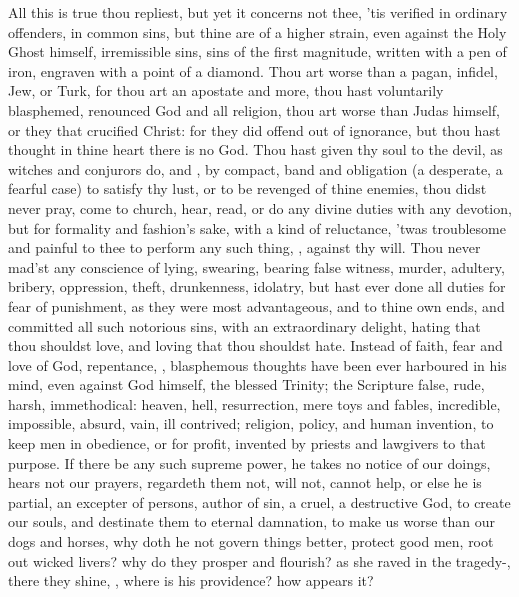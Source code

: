 {All this is true thou repliest, but yet it concerns not thee, 'tis
verified in ordinary offenders, in common sins, but thine are of a
higher strain, even against the Holy Ghost himself, irremissible sins,
sins of the first magnitude, written with a pen of iron, engraven with
a point of a diamond. Thou art worse than a pagan, infidel, Jew, or
Turk, for thou art an apostate and more, thou hast voluntarily
blasphemed, renounced God and all religion, thou art worse than Judas
himself, or they that crucified Christ: for they did offend out of
ignorance, but thou hast thought in thine heart there is no God. Thou
hast given thy soul to the devil, as witches and conjurors do,
 and , by compact, band and obligation (a desperate,
a fearful case) to satisfy thy lust, or to be revenged of thine
enemies, thou didst never pray, come to church, hear, read, or do any
divine duties with any devotion, but for formality and fashion's sake,
with a kind of reluctance, 'twas troublesome and painful to thee to
perform any such thing, , against thy will. Thou
never mad'st any conscience of lying, swearing, bearing false witness,
murder, adultery, bribery, oppression, theft, drunkenness, idolatry,
but hast ever done all duties for fear of punishment, as they were most
advantageous, and to thine own ends, and committed all such notorious
sins, with an extraordinary delight, hating that thou shouldst love,
and loving that thou shouldst hate. Instead of faith, fear and love of
God, repentance, \etc{}, blasphemous thoughts have been ever harboured in
his mind, even against God himself, the blessed Trinity; the
Scripture false, rude, harsh, immethodical: heaven, hell,
resurrection, mere toys and fables, incredible, impossible,
absurd, vain, ill contrived; religion, policy, and human invention, to
keep men in obedience, or for profit, invented by priests and lawgivers
to that purpose. If there be any such supreme power, he takes no notice
of our doings, hears not our prayers, regardeth them not, will not,
cannot help, or else he is partial, an excepter of persons, author of
sin, a cruel, a destructive God, to create our souls, and destinate
them to eternal damnation, to make us worse than our dogs and horses,
why doth he not govern things better, protect good men, root out wicked
livers? why do they prosper and flourish? as she raved in the
tragedy-, there they shine, , where is his providence? how appears it?

}
